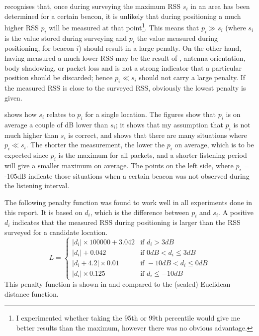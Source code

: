 \BRP recognises that, once during surveying the maximum RSS $s_i$ in an area has been determined for a certain beacon, it is unlikely that during positioning a much higher RSS $p_i$ will be measured at that point\footnote{I experimented whether taking the 95th or 99th percentile would give me better results than the maximum, however there was no obvious advantage.}.
This means that $p_i \gg s_i$ (where $s_i$ is the value stored during surveying and $p_i$ the value measured during positioning, for beacon $i$) should result in a large penalty.
On the other hand, having measured a much lower RSS may be the result of \mpi, antenna orientation, body shadowing, or packet loss and is not a strong indicator that a particular position should be discarded; hence $p_i \ll s_i$ should not carry a large penalty.
If the measured RSS is close to the surveyed RSS, obviously the lowest penalty is given.

 shows how $s_i$ relates to $p_i$ for a single location.
The figures show that $p_i$ is on average a couple of dB lower than $s_i$; it shows that my assumption that $p_i$ is not much higher than $s_i$ is correct, and shows that there are many situations where $p_i \ll s_i$.
The shorter the measurement, the lower the $p_i$ on average, which is to be expected since $p_i$ is the maximum for all packets, and a shorter listening period will give a smaller maximum on average.
The points on the left side, where $p_i$ = -105dB indicate those situations when a certain beacon was not observed during the listening interval.

The following penalty function was found to work well in all experiments done in this report.
It is based on $d_i$, which is the difference between $p_i$ and $s_i$.
A positive $d_i$ indicates that the measured RSS during positioning is larger than the RSS surveyed for a candidate location.
\begin{equation}
    L = \begin{cases}
        |d_i| \times 100000 +3.042  & \text{if } d_i > 3dB \\
        |d_i| +0.042                & \text{if } 0dB < d_i \leq 3dB \\
        |d_i+4.2| \times 0.01       & \text{if } -10dB < d_i \leq 0dB \\
        |d_i| \times 0.125          & \text{if } d_i \leq -10dB 
    \end{cases}
    \label{eq:architecture-BRP-punishment}
\end{equation}
This penalty function is shown in  and compared to the (scaled) Euclidean distance function.

